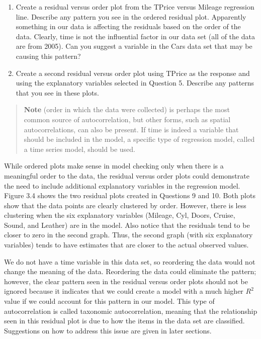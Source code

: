 \documentclass[
]{report}
\begin{document}
\begin{enumerate}
\def\labelenumi{\arabic{enumi}.}
\setcounter{enumi}{8}
\item
  Create a residual versus order plot from the TPrice versus Mileage regression line. Describe any pattern you see in the ordered residual plot. Apparently something in our data is affecting the residuals based on the order of the data. Clearly, time is not the influential factor in our data set (all of the data are from 2005). Can you suggest a variable in the Cars data set that may be causing this pattern?
\item
  Create a second residual versus order plot using TPrice as the response and using the explanatory variables selected in Question 5. Describe any patterns that you see in these plots.
\end{enumerate}

\begin{quote}
\textbf{Note} (order in which the data were collected) is perhaps the most common source of autocorrelation, but other forms, such as spatial autocorrelations, can also be present. If time is indeed a variable that should be included in the model, a specific type of regression model, called a time series model, should be used.
\end{quote}

While ordered plots make sense in model checking only when there is a meaningful order to the data, the residual versus order plots could demonstrate the need to include additional explanatory variables in the regression model. Figure 3.4 shows the two residual plots created in Questions 9 and 10. Both plots show that the data points are clearly clustered by order. However, there is less clustering when the six explanatory variables (Mileage, Cyl, Doors, Cruise, Sound, and Leather) are in the model. Also notice that the residuals tend to be closer to zero in the second graph. Thus, the second graph (with six explanatory variables) tends to have estimates that are closer to the actual observed values.

We do not have a time variable in this data set, so reordering the data would not change the meaning of the data. Reordering the data could eliminate the pattern; however, the clear pattern seen in the residual versus order plots should not be ignored because it indicates that we could create a model with a much higher \(R^2\) value if we could account for this pattern in our model. This type of autocorrelation is called taxonomic autocorrelation, meaning that the relationship seen in this residual plot is due to
how the items in the data set are classified. Suggestions on how to address this issue are given in later sections.
\end{document}
